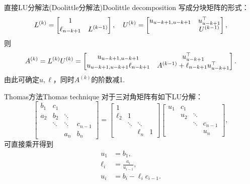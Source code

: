 \begin{theorem}
    {直接LU分解法(Doolittle分解法)}{Doolittle decomposition}
    写成分块矩阵的形式：
    \[
        L^{(k)} = \begin{bmatrix}
            1\\\ell_{n-k+1}&L^{(k-1)}
        \end{bmatrix},\quad
        U^{(k)} = \begin{bmatrix}
            u_{u-k+1,u-k+1}&u_{u-k+1}^\top\\ &U^{(k-1)}
        \end{bmatrix},
    \]
    则
    \[
        A^{(k)} = L^{(k)}U^{(k)} = \begin{bmatrix}
            u_{u-k+1,u-k+1}&u_{u-k+1}^\top\\
            u_{u-k+1,u-k+1}\ell_{n-k+1}&A^{(k-1)} + \ell_{n-k+1}u_{u-k+1}^\top
        \end{bmatrix}.
    \]
    由此可确定$u,\ell$，同时$A^{(k)}$的阶数减1.
\end{theorem}

\begin{theorem}
    {Thomas方法}{Thomas technique}
    对于三对角矩阵有如下LU分解：
    \begin{equation}\label{eq:na-tridiagonal-lu}
        \begin{bmatrix}
        b_1&c_1\\a_2&b_2&\ddots\\ &\ddots&\ddots&c_{n-1}\\ &&a_n&b_n
        \end{bmatrix} = \begin{bmatrix}
            1\\\ell_2&1\\&\ddots&\ddots\\ &&\ell_n&1
        \end{bmatrix}\begin{bmatrix}
            u_1&c_1\\ &u_2&\ddots\\ &&\ddots&c_{n-1}\\ &&&u_n
        \end{bmatrix},
    \end{equation}
    可直接乘开得到
    \begin{subequations}
        \begin{align}
            u_1 &= b_1,\\
            \ell_i &= \frac{a_i}{u_{i-1}},\\
            u_i &= b_i - \ell_ic_{i-1}.
        \end{align}
    \end{subequations}
\end{theorem}
    
